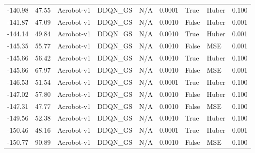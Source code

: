 \begin{tabular}{rrlllrllr}
-140.98 &   47.55 &      Acrobot-v1 &  DDQN\_GS &    N/A &  0.0001 &      True &         Huber &         0.100 \\
-141.87 &   47.09 &      Acrobot-v1 &  DDQN\_GS &    N/A &  0.0010 &     False &         Huber &         0.001 \\
-144.14 &   49.84 &      Acrobot-v1 &  DDQN\_GS &    N/A &  0.0010 &      True &         Huber &         0.001 \\
-145.35 &   55.77 &      Acrobot-v1 &  DDQN\_GS &    N/A &  0.0010 &     False &           MSE &         0.001 \\
-145.66 &   56.42 &      Acrobot-v1 &  DDQN\_GS &    N/A &  0.0010 &      True &         Huber &         0.100 \\
-145.66 &   67.97 &      Acrobot-v1 &  DDQN\_GS &    N/A &  0.0010 &     False &           MSE &         0.001 \\
-146.53 &   51.54 &      Acrobot-v1 &  DDQN\_GS &    N/A &  0.0001 &      True &         Huber &         0.100 \\
-147.02 &   57.80 &      Acrobot-v1 &  DDQN\_GS &    N/A &  0.0010 &     False &         Huber &         0.100 \\
-147.31 &   47.77 &      Acrobot-v1 &  DDQN\_GS &    N/A &  0.0010 &     False &           MSE &         0.100 \\
-149.56 &   52.38 &      Acrobot-v1 &  DDQN\_GS &    N/A &  0.0010 &      True &         Huber &         0.100 \\
-150.46 &   48.16 &      Acrobot-v1 &  DDQN\_GS &    N/A &  0.0001 &      True &         Huber &         0.001 \\
-150.77 &   90.89 &      Acrobot-v1 &  DDQN\_GS &    N/A &  0.0010 &     False &           MSE &         0.100 \\
\bottomrule
\end{tabular}
